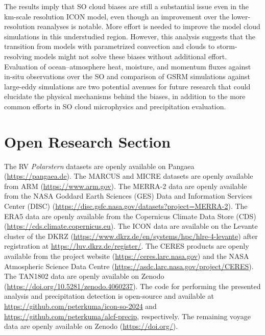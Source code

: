 \documentclass[draft]{agujournal2019}
\begin{document}
The results imply that SO cloud biases are still a substantial issue even in the km-scale resolution ICON model, even though an improvement over the lower-resolution reanalyses is notable. More effort is needed to improve the model cloud simulations in this understudied region. However, this analysis suggests that the transition from models with parametrized convection and clouds to storm-resolving models might not solve these biases without additional effort. Evaluation of ocean--atmosphere heat, moisture, and momentum fluxes against in-situ observations over the SO and comparison of GSRM simulations against large-eddy simulations are two potential avenues for future research that could elucidate the physical mechanisms behind the biases, in addition to the more common efforts in SO cloud microphysics and precipitation evaluation.

\section*{Open Research Section}

The RV \emph{Polarstern} datasets are openly available on Pangaea (\url{https://pangaea.de}). The MARCUS and MICRE datasets are openly available from ARM (\url{https://www.arm.gov}). The MERRA-2 data are openly available from the NASA Goddard Earth Sciences (GES) Data and Information Services Center (DISC) (\url{https://disc.gsfc.nasa.gov/datasets?project=MERRA-2}). The ERA5 data are openly available from the Copernicus Climate Data Store (CDS) (\url{https://cds.climate.copernicus.eu}). The ICON data are available on the Levante cluster of the DKRZ (\url{https://www.dkrz.de/en/systems/hpc/hlre-4-levante}) after registration at \url{https://luv.dkrz.de/register/}. The CERES products are openly available from the project website (\url{https://ceres.larc.nasa.gov}) and the NASA Atmospheric Science Data Centre (\url{https://asdc.larc.nasa.gov/project/CERES}). The TAN1802 data are openly available on Zenodo (\url{https://doi.org/10.5281/zenodo.4060237}). The code for performing the presented analysis and precipitation detection is open-source and available at \url{https://github.com/peterkuma/icon-so-2024} and \url{https://github.com/peterkuma/alcf-precip}, respectively. The remaining voyage data are openly available on Zenodo (\url{https://doi.org/}).

\acknowledgments
\end{document}
